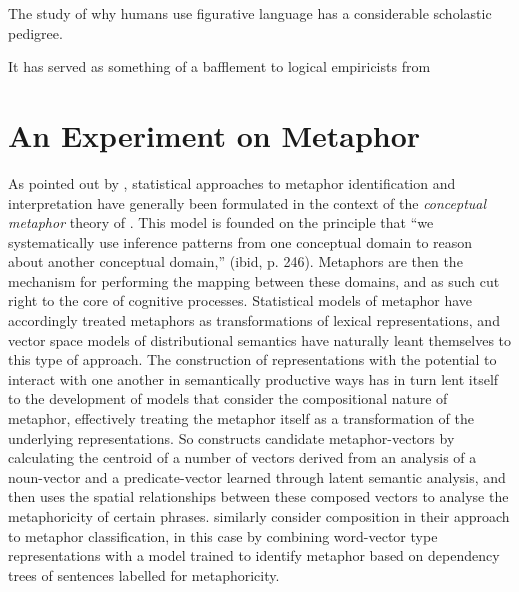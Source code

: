 The study of why humans use figurative language has a considerable scholastic pedigree.

It has served as something of a bafflement to logical empiricists from 

\section{An Experiment on Metaphor}
As pointed out by \cite{ShutovaEA2013}, statistical approaches to metaphor identification and interpretation have generally been formulated in the context of the \emph{conceptual metaphor} theory of \cite{LakoffEA2003}.  This model is founded on the principle that ``we systematically use inference patterns from one conceptual domain to reason about another conceptual domain,'' (ibid, p. 246).  Metaphors are then the mechanism for performing the mapping between these domains, and as such cut right to the core of cognitive processes.  Statistical models of metaphor have accordingly treated metaphors as transformations of lexical representations, and vector space models of distributional semantics have naturally leant themselves to this type of approach.  The construction of representations with the potential to interact with one another in semantically productive ways has in turn lent itself to the development of models that consider the compositional nature of metaphor, effectively treating the metaphor itself as a transformation of the underlying representations.  So \cite{Utsumi2011} constructs candidate metaphor-vectors by calculating the centroid of a number of vectors derived from an analysis of a noun-vector and a predicate-vector learned through latent semantic analysis, and then uses the spatial relationships between these composed vectors to analyse the metaphoricity of certain phrases.  \cite{HovyEA2013} similarly consider composition in their approach to metaphor classification, in this case by combining word-vector type representations with a model trained to identify metaphor based on dependency trees of sentences labelled for metaphoricity.

